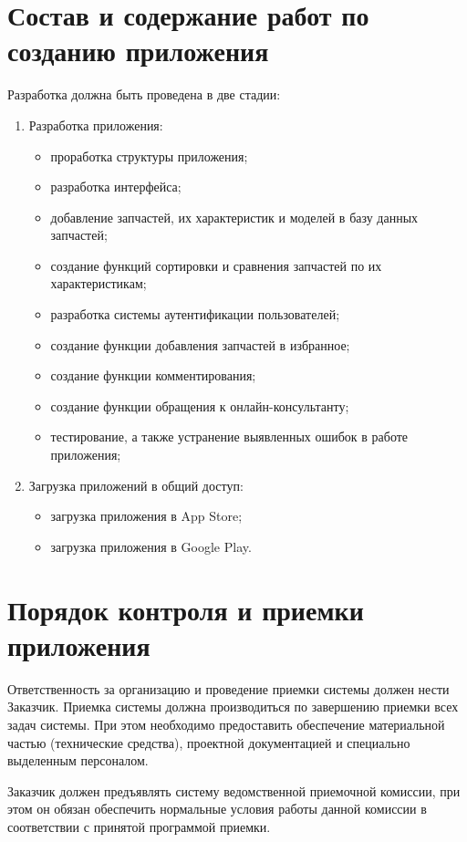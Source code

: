 \documentclass[14pt]{extreport}
\begin{document}
\chapter{Состав и содержание работ по созданию приложения}
Разработка должна быть проведена в две стадии:
\begin{enumerate}
	\item Разработка приложения:
	\begin{itemize}
		\item проработка структуры приложения;
		\item разработка интерфейса;
		\item добавление запчастей, их характеристик и моделей в базу данных запчастей;
		\item создание функций сортировки и сравнения запчастей по их характеристикам;
		\item разработка системы аутентификации пользователей;
		\item создание функции добавления запчастей в избранное;
		\item создание функции комментирования;
		\item создание функции обращения к онлайн-консультанту;
		\item тестирование, а также устранение выявленных ошибок в работе приложения;
	\end{itemize}
	\item Загрузка приложений в общий доступ:
	\begin{itemize}
		\item загрузка приложения в App Store;
		\item загрузка приложения в Google Play.
	\end{itemize}
\end{enumerate} 


\chapter{Порядок контроля и приемки приложения}
Ответственность за организацию и проведение приемки системы должен нести Заказчик. Приемка системы должна производиться по завершению приемки всех задач системы. При этом необходимо предоставить обеспечение материальной частью (технические средства), проектной документацией и специально выделенным персоналом.

Заказчик должен предъявлять систему ведомственной приемочной комиссии, при этом он обязан обеспечить нормальные условия работы данной комиссии в соответствии с принятой программой приемки.
\end{document}
